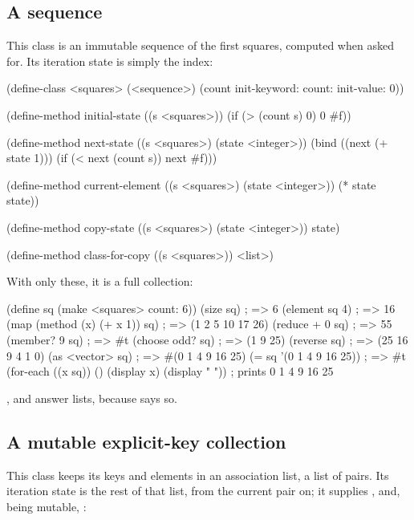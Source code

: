\subsection{A sequence}

This class is an immutable sequence of the first  squares,
computed when asked for. Its iteration state is simply the index:

\begin{dylan}
(define-class <squares> (<sequence>)
  (count init-keyword: count: init-value: 0))

(define-method initial-state ((s <squares>))
  (if (> (count s) 0) 0 #f))

(define-method next-state ((s <squares>) (state <integer>))
  (bind ((next (+ state 1)))
    (if (< next (count s)) next #f)))

(define-method current-element ((s <squares>) (state <integer>))
  (* state state))

(define-method copy-state ((s <squares>) (state <integer>))
  state)

(define-method class-for-copy ((s <squares>)) <list>)
\end{dylan}

\noindent With only these, it is a full collection:

\begin{dylan}
(define sq (make <squares> count: 6))
(size sq)                          ; => 6
(element sq 4)                     ; => 16
(map (method (x) (+ x 1)) sq)      ; => (1 2 5 10 17 26)
(reduce + 0 sq)                    ; => 55
(member? 9 sq)                     ; => #t
(choose odd? sq)                   ; => (1 9 25)
(reverse sq)                       ; => (25 16 9 4 1 0)
(as <vector> sq)                   ; => #(0 1 4 9 16 25)
(= sq '(0 1 4 9 16 25))            ; => #t
(for-each ((x sq)) ()
  (display x) (display " "))       ; prints 0 1 4 9 16 25
\end{dylan}

\noindent {},  and  answer lists,
because  says so.

\subsection{A mutable explicit-key collection}

This class keeps its keys and elements in an association list, a list
of pairs. Its iteration state is the rest of that list, from the current
pair on; it supplies , and, being mutable,
:

